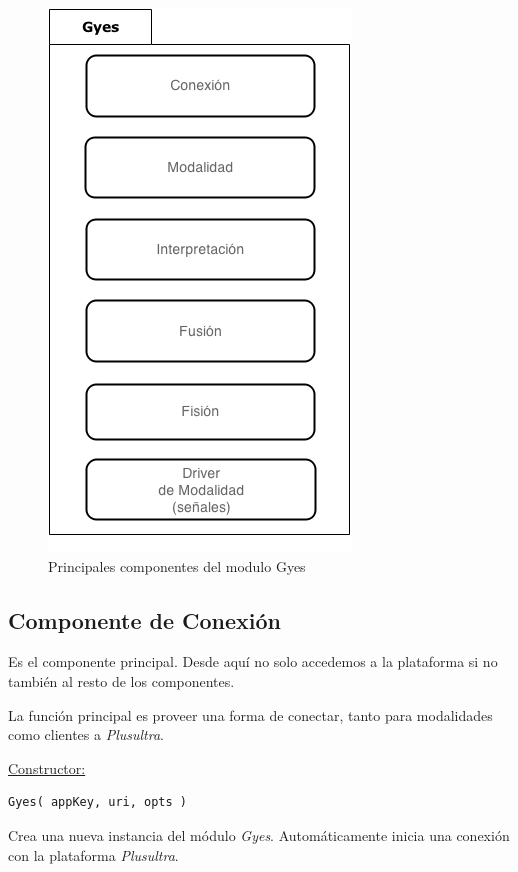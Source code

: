 \begin{center}
  \begin{figure}[h]
    \centering
    \includegraphics[scale=0.7]{gfx/gyes}
    \caption{Principales componentes del modulo Gyes}
    \label{fig:arq_ours_gyes}
  \end{figure}
\end{center}


\subsection{Componente de Conexión}

Es el componente principal. Desde aquí no solo accedemos a la plataforma si no también al resto de los componentes. 

La función principal es proveer una forma de conectar, tanto para modalidades como clientes a \emph{Plusultra}.


\underline{\textsf{Constructor:}}
\begin{lstlisting}
Gyes( appKey, uri, opts )
\end{lstlisting}
Crea una nueva instancia del módulo \emph{Gyes}. Automáticamente inicia una conexión con la plataforma \emph{Plusultra}. 

